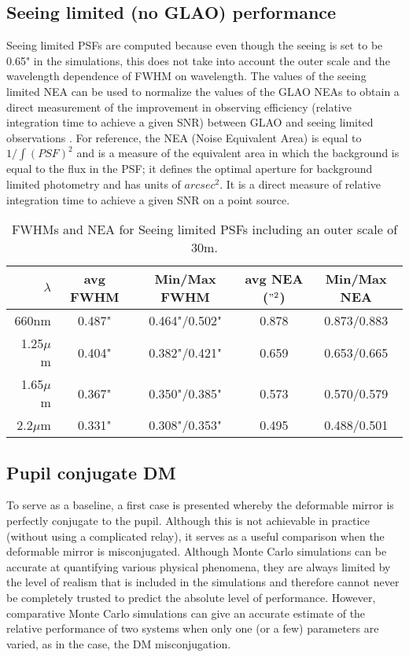 \documentclass[aas_macros,10pt]{article}
\begin{document}
\subsection{Seeing limited (no GLAO) performance}

Seeing limited PSFs are computed because even though the seeing is set to be 0.65" in the simulations, 
this does not take into account the outer scale and the wavelength dependence of FWHM on wavelength. The 
values of the seeing limited NEA can be used to normalize the values of the GLAO NEAs to obtain a direct 
measurement of the improvement in observing efficiency (relative integration time to achieve a given SNR) 
between GLAO and seeing limited observations \cite{King83}. For reference, the NEA (Noise Equivalent Area) 
is equal to $1/\int(PSF)^2$ and is a measure of the equivalent area in which the background is equal to the 
flux in the PSF; it defines the optimal aperture for background limited photometry and has units of $arcsec^2$. 
It is a direct measure of relative integration time to achieve a given SNR on a point source.

\begin{table}[ht]
\centering
\caption{FWHMs and NEA for Seeing limited PSFs including an outer scale of 30m.}
\begin{tabular}{||r||c|c||c|c||} \hline\hline
$\lambda$ & avg FWHM & Min/Max FWHM & avg NEA ($"^2$) & Min/Max NEA \\ \hline\hline
660nm & 0.487" & 0.464"/0.502"  & 0.878  & 0.873/0.883 \\\hline
1.25$\mu$m & 0.404" & 0.382"/0.421" & 0.659  & 0.653/0.665  \\ \hline
1.65$\mu$m & 0.367" &  0.350"/0.385" & 0.573 & 0.570/0.579  \\ \hline
2.2$\mu$m & 0.331"  & 0.308"/0.353" & 0.495 & 0.488/0.501 \\ \hline \hline 
\end{tabular}
\end{table}

\subsection{Pupil conjugate DM}
To serve as a baseline, a first case is presented whereby the deformable mirror is perfectly conjugate 
to the pupil. Although this is not achievable in practice (without using a complicated relay), it 
serves as a useful comparison when the deformable mirror is misconjugated. Although Monte Carlo 
simulations can be accurate at quantifying various physical phenomena, they are always limited by the 
level of realism that is included in the simulations and therefore cannot never be completely trusted 
to predict the absolute level of performance. However, comparative Monte Carlo simulations can give an 
accurate estimate of the relative performance of two systems when only one (or a few) parameters are 
varied, as in the case, the DM misconjugation.
\end{document}
